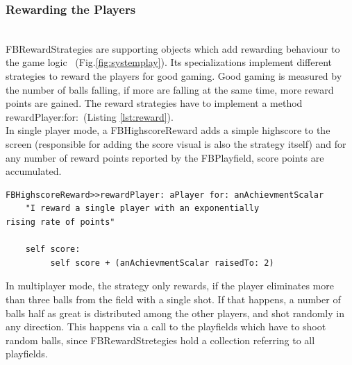 \subsubsection{Rewarding the Players} ~\\
FBRewardStrategies are supporting objects which add rewarding behaviour 
to the game logic
~(Fig.\ref{fig:systemplay}). Its specializations 
implement different strategies to
reward the players for good gaming. Good gaming is measured by the 
number of balls falling, if more are falling at the same time, more 
reward points are gained.
The reward strategies have to implement a method
rewardPlayer:for:~(Listing \ref{lst:reward}).\\
In single player mode, a FBHighscoreReward
adds a simple highscore to the screen (responsible for adding the 
score visual is also the strategy itself) and for any number of 
reward points reported by the FBPlayfield, score points are accumulated.
%
\begin{lstlisting}[float,label=lst:reward,caption=The Highscore Calculation Method]
FBHighscoreReward>>rewardPlayer: aPlayer for: anAchievmentScalar
    "I reward a single player with an exponentially 
rising rate of points" 

    self score:
         self score + (anAchievmentScalar raisedTo: 2)
\end{lstlisting}
%
In multiplayer mode, the strategy only rewards, if the player eliminates 
more than three balls from the field with a single shot. If that happens, 
a number of balls half as great is distributed among the other players,
and shot randomly in any direction. This happens via a call to 
the playfields which have to shoot random balls, since FBRewardStretegies
hold a collection referring to all playfields.
%
